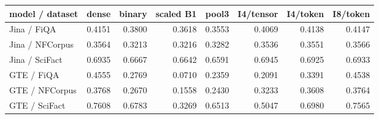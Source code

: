 \begin{tabular}{lrrrrrrr}
\toprule
model / dataset & dense & binary & scaled B1 & pool3 & I4/tensor & I4/token & I8/token \\
\midrule
Jina / FiQA & 0.4151 & 0.3800 & 0.3618 & 0.3553 & 0.4069 & 0.4138 & 0.4147 \\
Jina / NFCorpus & 0.3564 & 0.3213 & 0.3216 & 0.3282 & 0.3536 & 0.3551 & 0.3566 \\
Jina / SciFact & 0.6935 & 0.6667 & 0.6642 & 0.6591 & 0.6945 & 0.6925 & 0.6933 \\
GTE / FiQA & 0.4555 & 0.2769 & 0.0710 & 0.2359 & 0.2091 & 0.3391 & 0.4538 \\
GTE / NFCorpus & 0.3768 & 0.2670 & 0.1558 & 0.2430 & 0.3233 & 0.3608 & 0.3764 \\
GTE / SciFact & 0.7608 & 0.6783 & 0.3269 & 0.6513 & 0.5047 & 0.6980 & 0.7565 \\
\bottomrule
\end{tabular}
